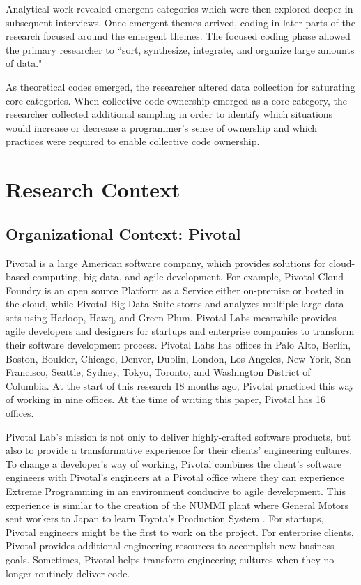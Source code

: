 Analytical work revealed emergent categories which were then explored deeper in subsequent interviews.  Once emergent themes arrived, coding in later parts of the research focused around the emergent themes. The focused coding phase allowed the primary researcher to ``sort, synthesize, integrate, and organize large amounts of data."

As theoretical codes emerged, the researcher altered data collection for saturating core categories. When collective code ownership emerged as a core category, the researcher collected additional sampling in order to identify which situations would increase or decrease a programmer's sense of ownership and which practices were required to enable collective code ownership.

\section{Research Context}
\label{ResearchContext}
\subsection{Organizational Context: Pivotal}
Pivotal is a large American software company, which provides solutions for cloud-based computing, big data, and agile development. For example, Pivotal Cloud Foundry is an open source Platform as a Service either on-premise or hosted in the cloud, while Pivotal Big Data Suite stores and analyzes multiple large data sets using Hadoop, Hawq, and Green Plum. Pivotal Labs meanwhile provides agile developers and designers for startups and enterprise companies to transform their software development process. Pivotal Labs has offices in Palo Alto, Berlin, Boston, Boulder, Chicago, Denver, Dublin, London, Los Angeles, New York, San Francisco, Seattle, Sydney, Tokyo, Toronto, and Washington District of Columbia. At the start of this research 18 months ago, Pivotal practiced this way of working in nine offices. At the time of writing this paper, Pivotal has 16 offices. 

Pivotal Lab's mission is not only to deliver highly-crafted software products, but also to provide a transformative experience for their clients' engineering cultures. To change a developer's way of working, Pivotal combines the client's software engineers with Pivotal's engineers at a Pivotal office where they can experience Extreme Programming in an environment conducive to agile development. This experience is similar to the creation of the NUMMI plant where General Motors sent workers to Japan to learn Toyota's Production System \cite{Nummi}. For startups, Pivotal engineers might be the first to work on the project. For enterprise clients, Pivotal provides additional engineering resources to accomplish new business goals. Sometimes, Pivotal helps transform engineering cultures when they no longer routinely deliver code.  

